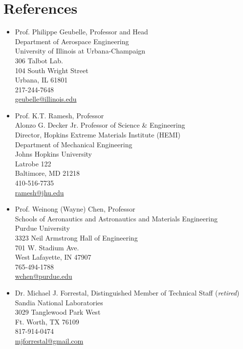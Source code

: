 \section*{References}

\begin{itemize}

    \item Prof. Philippe Geubelle, Professor and Head \\  Department of Aerospace Engineering \\ University of Illinois at Urbana-Champaign \\ 306 Talbot Lab. \\ 104 South Wright Street \\ Urbana, IL 61801 \\ 217-244-7648 \\ \href{mailto:geubelle@illinois.edu}{geubelle@illinois.edu}

    \item Prof. K.T. Ramesh, Professor \\ Alonzo G. Decker Jr. Professor of Science \& Engineering \\ Director, Hopkins Extreme Materials Institute (HEMI) \\ Department of Mechanical Engineering \\ Johns Hopkins University \\ Latrobe 122 \\ Baltimore, MD 21218 \\ 410-516-7735 \\ \href{mailto:ramesh@jhu.edu}{ramesh@jhu.edu}

    \item Prof. Weinong (Wayne) Chen, Professor \\ Schools of Aeronautics and Astronautics and Materials Engineering \\ Purdue University\\ 3323 Neil Armstrong Hall of Engineering \\ 701 W. Stadium Ave. \\ West Lafayette, IN 47907 \\ 765-494-1788 \\ \href{mailto:wchen@purdue.edu}{wchen@purdue.edu}

    \item Dr. Michael J. Forrestal, Distinguished Member of Technical Staff ({\it retired}) \\ Sandia National Laboratories\\ 3029 Tanglewood Park West \\ Ft. Worth, TX 76109 \\ 817-914-0474 \\ \href{mailto:mjforrestal@gmail.com}{mjforrestal@gmail.com}


\end{itemize}
